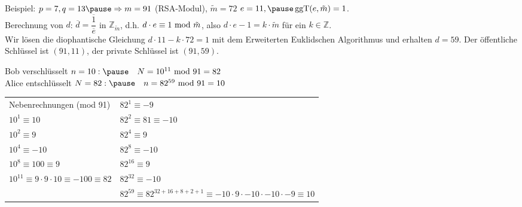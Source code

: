 \begin{frame}[fragile]
Beispiel: $p = 7, q = 13 \pause \Rightarrow m = 91$ (RSA-Modul), $\tilde{m} =  72$ \pause
$e =11, \pause \ggT(e,\tilde{m}) = 1$. \\ \pause
Berechnung von $d$:  $\overline{d} = \dfrac{\overline{1}}{\overline{e}}$ in $\mathbb{Z}_{\tilde{m}}$\pause, d.h. 
$d \cdot e\equiv1\text{ mod }\tilde{m}$\pause, also $d \cdot e - 1 = k \cdot \tilde{m}$ für ein  $k \in \mathbb{Z}$. \\ \pause
Wir lösen die diophantische Gleichung $d \cdot 11 - k \cdot 72 = 1$ \pause mit dem Erweiterten Euklidschen Algorithmus und erhalten $d=59$. \pause Der öffentliche Schlüssel ist $(91,11)$, der private Schlüssel ist $(91,59)$. \pause

Bob verschlüsselt $n=10: \pause \quad N= 10^{11} \tmod 91 = 82$  \\ \pause
Alice entschlüsselt $N=82: \pause \quad n = 82^{59} \tmod 91 = 10$ \pause

\footnotesize
\begin{tabular}{l l}
Nebenrechnungen (mod 91)  &    $82^1 \equiv -9 $ \\
$10^1 \equiv 10 $ & $82^2 \equiv 81 \equiv -10$\\
$10^2 \equiv 9 $ & $82^4 \equiv 9$\\
$10^4 \equiv -10 $ & $82^8 \equiv -10$\\
$10^8 \equiv 100 \equiv 9$ & $82^{16} \equiv 9$\\
$10^{11} \equiv 9 \cdot 9 \cdot 10 \equiv -100 \equiv 82$ & $82^{32} \equiv -10$\\
&  $82^{59} \equiv 82^{32+16+8+2+1} \equiv -10 \cdot 9 \cdot -10 \cdot -10 \cdot -9 \equiv 10$
\end{tabular}
\end{frame}

